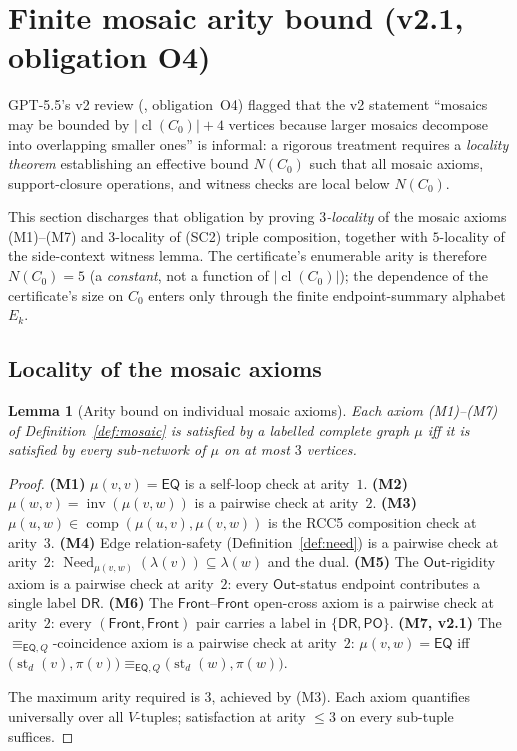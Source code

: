 \documentclass[11pt]{article}
\newtheorem{lemma}[theorem]{Lemma}
\theoremstyle{definition}
\theoremstyle{remark}
\newcommand{\DR}{\mathsf{DR}}
\newcommand{\PO}{\mathsf{PO}}
\newcommand{\EQ}{\mathsf{EQ}}
\newcommand{\cl}{\operatorname{cl}}
\newcommand{\st}{\operatorname{st}}
\newcommand{\comp}{\operatorname{comp}}
\newcommand{\inv}{\operatorname{inv}}
\newcommand{\Need}{\operatorname{Need}}
\newcommand{\Out}{\mathsf{Out}}
\newcommand{\Front}{\mathsf{Front}}
\newcommand{\eqQ}{\equiv_{\EQ,Q}}
\begin{document}
\section{Finite mosaic arity bound (v2.1, obligation O4)}
\label{sec:arity-bound}

GPT-5.5's v2 review (\cite{GPT55V2Review}, obligation~O4) flagged
that the v2 statement ``mosaics may be bounded by $|\cl(C_0)|+4$
vertices because larger mosaics decompose into overlapping smaller
ones'' is informal: a rigorous treatment requires a
\emph{locality theorem} establishing an effective bound
$N(C_0)$ such that all mosaic axioms, support-closure operations,
and witness checks are local below $N(C_0)$.

This section discharges that obligation by proving
\emph{$3$-locality} of the mosaic axioms (M1)--(M7) and
$3$-locality of (SC2) triple composition, together with $5$-locality
of the side-context witness lemma.  The certificate's enumerable
arity is therefore $N(C_0)=5$ (a \emph{constant}, not a function of
$|\cl(C_0)|$); the dependence of the certificate's size on $C_0$
enters only through the finite endpoint-summary alphabet $E_k$.

\subsection{Locality of the mosaic axioms}

\begin{lemma}[Arity bound on individual mosaic axioms]
\label{lem:axiom-arity}
Each axiom (M1)--(M7) of Definition~\ref{def:mosaic} is satisfied
by a labelled complete graph $\mu$ iff it is satisfied by every
sub-network of $\mu$ on at most $3$ vertices.
\end{lemma}

\begin{proof}
\textbf{(M1)} $\mu(v,v)=\EQ$ is a self-loop check at arity~$1$.
\textbf{(M2)} $\mu(w,v)=\inv(\mu(v,w))$ is a pairwise check at
arity~$2$.
\textbf{(M3)} $\mu(u,w)\in\comp(\mu(u,v),\mu(v,w))$ is the RCC5
composition check at arity~$3$.
\textbf{(M4)} Edge relation-safety
(Definition~\ref{def:need}) is a pairwise check at arity~$2$:
$\Need_{\mu(v,w)}(\lambda(v))\subseteq\lambda(w)$ and the dual.
\textbf{(M5)} The $\Out$-rigidity axiom is a pairwise check at
arity~$2$: every $\Out$-status endpoint contributes a single label
$\DR$.
\textbf{(M6)} The $\Front$--$\Front$ open-cross axiom is a pairwise
check at arity~$2$: every $(\Front,\Front)$ pair carries a label in
$\{\DR,\PO\}$.
\textbf{(M7, v2.1)} The $\eqQ$-coincidence axiom is a pairwise
check at arity~$2$: $\mu(v,w)=\EQ$ iff
$\bigl(\st_d(v),\pi(v)\bigr)\eqQ\bigl(\st_d(w),\pi(w)\bigr)$.

The maximum arity required is $3$, achieved by (M3).  Each axiom
quantifies universally over all $V$-tuples; satisfaction at arity
$\le 3$ on every sub-tuple suffices.\end{proof}
\end{document}
